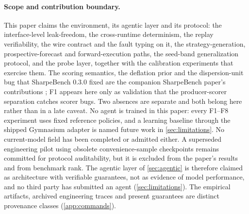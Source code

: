 \paragraph{Scope and contribution boundary.} This paper claims the environment, its agentic layer and its protocol: the interface-level leak-freedom, the cross-runtime determinism, the replay verifiability, the wire contract and the fault typing on it, the strategy-generation, prospective-forecast and forward-execution paths, the seed-band generalization protocol, and the probe layer, together with the calibration experiments that exercise them. The scoring semantics, the deflation prior and the dispersion-unit bug that SharpeBench 0.3.0 fixed are the companion SharpeBench paper's contributions \citep{toca2026sharpebench}; F1 appears here only as validation that the producer-scorer separation catches scorer bugs. Two absences are separate and both belong here rather than in a late caveat. No agent is trained in this paper: every F1--F8 experiment uses fixed reference policies, and a learning baseline through the shipped Gymnasium adapter is named future work in \cref{sec:limitations}. No current-model field has been completed or admitted either. A superseded engineering pilot using obsolete convenience-sample checkpoints remains committed for protocol auditability, but it is excluded from the paper's results and from benchmark rank. The agentic layer of \cref{sec:agentic} is therefore claimed as architecture with verifiable guarantees, not as evidence of model performance, and no third party has submitted an agent (\cref{sec:limitations}). The empirical artifacts, archived engineering traces and present guarantees are distinct provenance classes (\cref{app:commands}).

